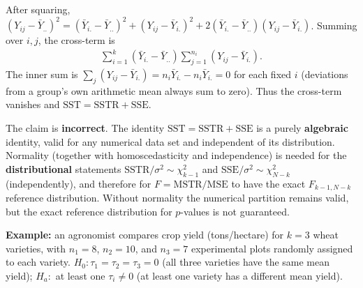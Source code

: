 \begin{solproblema}[prob:614e799]
After squaring, $(Y_{ij}-\bar Y_{..})^2 = (\bar Y_{i.}-\bar Y_{..})^2+(Y_{ij}-\bar Y_{i.})^2+2(\bar Y_{i.}-\bar Y_{..})(Y_{ij}-\bar Y_{i.})$. Summing over $i,j$, the cross-term is
\begin{align*}
\sum_{i=1}^k(\bar Y_{i.}-\bar Y_{..})\sum_{j=1}^{n_i}(Y_{ij}-\bar Y_{i.}).
\end{align*}
The inner sum is $\sum_j(Y_{ij}-\bar Y_{i.})=n_i\bar Y_{i.}-n_i\bar Y_{i.}=0$ for each fixed $i$ (deviations from a group's own arithmetic mean always sum to zero). Thus the cross-term vanishes and $\text{SST}=\text{SSTR}+\text{SSE}$.
\end{solproblema}

\begin{solproblema}[prob:792b2ff]
The claim is \textbf{incorrect}. The identity $\text{SST}=\text{SSTR}+\text{SSE}$ is a purely \textbf{algebraic} identity, valid for any numerical data set and independent of its distribution. Normality (together with homoscedasticity and independence) is needed for the \textbf{distributional} statements $\text{SSTR}/\sigma^2\sim\chi^2_{k-1}$ and $\text{SSE}/\sigma^2\sim\chi^2_{N-k}$ (independently), and therefore for $F=\text{MSTR}/\text{MSE}$ to have the exact $F_{k-1,N-k}$ reference distribution. Without normality the numerical partition remains valid, but the exact reference distribution for $p$-values is not guaranteed.
\end{solproblema}

\begin{solproblema}[prob:4e06b95]
\textbf{Example:} an agronomist compares crop yield (tons/hectare) for $k=3$ wheat varieties, with $n_1=8$, $n_2=10$, and $n_3=7$ experimental plots randomly assigned to each variety. $H_0:\tau_1=\tau_2=\tau_3=0$ (all three varieties have the same mean yield); $H_a:$ at least one $\tau_i\ne0$ (at least one variety has a different mean yield).
\end{solproblema}
